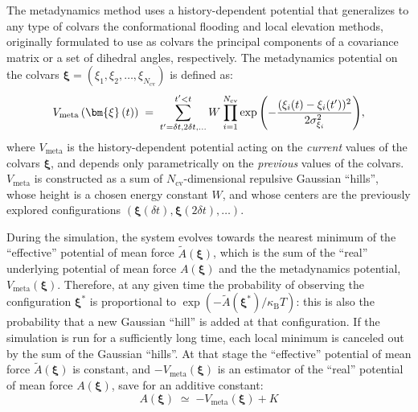 
The metadynamics method uses a history-dependent potential \cite{Laio2002} that generalizes to any type of colvars the conformational flooding \cite{Grubmuller1995} and local elevation \cite{Huber1994} methods,  originally formulated to use as colvars the principal components of a covariance matrix or a set of dihedral  angles, respectively.
The metadynamics potential on the colvars $\bm{\xi} = (\xi_{1}, \xi_{2}, \ldots, \xi_{N_{\mathrm{cv}}})$ is defined as:
\begin{equation}
  \label{eq:colvars_meta_pot}
  V_{\mathrm{meta}}\left(\bm{\xi}\left(t\right)\right) \; = \; {
    \sum_{t' = \delta{}t, \\ 2\delta{}t, \\ \ldots}^{t'<t} W \: {
      \prod_{i = 1}^{N_{\mathrm{cv}}}
      \exp\left(-\frac{(\xi_{i}(t)-\xi_{i}(t'))^{2}}{2\sigma_{\xi_{i}}^{2}}\right)
    }
  }\mathrm{,}
\end{equation}
where $V_{\mathrm{meta}}$ is the history-dependent potential acting on the \emph{current} values of the colvars $\bm{\xi}$, and depends only parametrically on the \emph{previous} values of the colvars.
$V_{\mathrm{meta}}$ is constructed as a sum of $N_{\mathrm{cv}}$-dimensional repulsive Gaussian ``hills'', whose height is a chosen energy constant $W$, and whose centers are the previously explored configurations $\left(\bm{\xi}(\delta{}t), \bm{\xi}(2\delta{}t), \ldots\right)$.

During the simulation, the system evolves towards the nearest minimum of the ``effective'' potential of mean force $\tilde{A}(\bm{\xi})$, which is the sum of the ``real'' underlying potential of mean force $A(\bm{\xi})$  and the the metadynamics potential, $V_{\mathrm{meta}}(\bm{\xi})$.
Therefore, at any given time the probability of observing the configuration $\bm{\xi^{*}}$ is proportional to $\exp\left(-\tilde{A}(\bm{\xi^{*}})/\kappa_{\mathrm{B}}T\right)$: this is also the probability that a new Gaussian ``hill'' is added at that configuration.
If the simulation is run for a sufficiently long time, each local minimum is canceled out by the sum of the Gaussian ``hills''.
At that stage the ``effective'' potential of mean force $\tilde{A}(\bm{\xi})$ is constant, and $-V_{\mathrm{meta}}(\bm{\xi})$ is an estimator of the ``real'' potential of mean force $A(\bm{\xi})$,  save for an additive constant:
\begin{equation}
  \label{eq:colvars_meta_fes}
  A(\bm{\xi}) \; \simeq \; {
    -V_{\mathrm{meta}}(\bm{\xi}) + K
  }
\end{equation}

